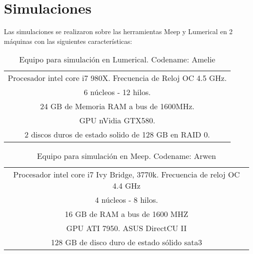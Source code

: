 \section{Simulaciones}
\label{sc:rr_simulation}

Las simulaciones se realizaron sobre las herramientas Meep y Lumerical en 2 máquinas con
las siguientes características:

\begin{table}[H]
\centering
\begin{tabular}{|c|}
\hline
Procesador intel core i7 980X. Frecuencia de Reloj OC 4.5 GHz. \\
6 núcleos - 12 hilos. \\
24 GB de Memoria RAM a bus de 1600MHz. \\
GPU nVidia GTX580. \\
2 discos duros de estado solido de 128 GB en RAID 0. \\
\hline
\end{tabular}
\caption{Equipo para simulación en Lumerical. Codename: Amelie}
\label{tb:pcsim1}
\end{table} 

\begin{table}[H]
\centering
\begin{tabular}{|c|}
\hline
Procesador intel core i7 Ivy Bridge, 3770k. Frecuencia de reloj OC 4.4 GHz \\
4 núcleos - 8 hilos. \\
16 GB de RAM a bus de 1600 MHZ \\
GPU ATI 7950. ASUS DirectCU II \\
128 GB  de disco duro de estado sólido sata3 \\
\hline
\end{tabular}
\caption{Equipo para simulación en Meep. Codename: Arwen}
\label{tb:pcsim2}
\end{table} 





